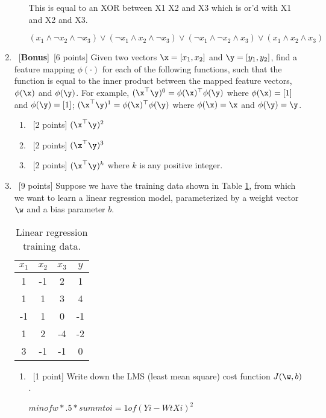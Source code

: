\documentclass[12pt, fullpage,letterpaper]{article}
\begin{document}
\begin{enumerate}
\begin{enumerate}
This is equal to an XOR between X1 X2 and X3 which is or'd with X1 and X2 and X3.

$ (x_1 \land \neg x_2  \land \neg x_3) \lor  (\neg x_1 \land x_2  \land \neg x_3) \lor  (\neg x_1 \land \neg  x_2  \land x_3) \lor  ( x_1 \land  x_2  \land x_3)$
	\end{enumerate}
	
	\item~[\textbf{Bonus}]~[6 points]  Given two vectors $\x = [x_1,  x_2]$ and $\y=[y_1,  y_2]$, find a feature mapping $\phi(\cdot)$ for each of the following functions, such that the function is equal to the inner product between the mapped feature vectors, $\phi(\x)$ and $\phi(\y)$. For example, $(\x^\top \y)^0 = \phi(\x)^\top \phi(\y)$ where $\phi(\x) = [1]$ and $\phi(\y) = [1]$; $(\x^\top \y)^1 = \phi(\x)^\top \phi(\y)$ where $\phi(\x) = \x$ and $\phi(\y) = \y$. 
	\begin{enumerate}
		\item~[2 points] $(\x^\top \y)^2$
		\item~[2 points] $(\x^\top \y)^3$
		\item~[2 points] $(\x^\top \y)^k$ where $k$ is  any positive integer.  
	\end{enumerate}

\item~[9 points] Suppose we have the training data shown in Table \ref{tb:1}, from which we want to learn a linear regression model, parameterized by a weight vector $\w$ and a bias parameter $b$.  
\begin{table}
	\centering
	\begin{tabular}{ccc|c}
		$x_1 $ & $x_2$ & $x_3$ &  $y$\\ 
		\hline\hline
		1 & -1 & 2 & 1 \\ \hline
		1 & 1 & 3 & 4 \\ \hline
		-1 & 1 & 0 & -1 \\ \hline
		1 & 2 & -4 & -2 \\ \hline
		3 & -1 & -1 & 0\\ \hline
	\end{tabular}
	\caption{Linear regression training data.}\label{tb:1}
\end{table}

\begin{enumerate}
	\item~[1 point] Write down the LMS (least mean square) cost function $J(\w, b)$. \newline

$min of w *.5 * sum m to i = 1 of (Yi - WtXi)^2$


\end{enumerate}
\end{enumerate}
\end{document}
